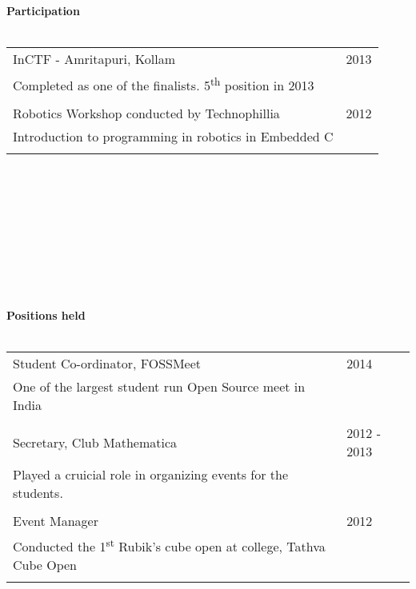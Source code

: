 \documentclass[a4paper,10pt]{article} %
\begin{document}
\textbf{Participation}\\ \\
\begin{tabular}{p{11cm}p{11cm}}
        \textsf{InCTF - Amritapuri, Kollam}                                                & \textsf{2013} \\
        \textsf{Completed as one of the finalists. 5\textsuperscript{th} position in 2013} & \\ \\
        \textsf{Robotics Workshop conducted by Technophillia}                              & \textsf{2012} \\
        \textsf{Introduction to programming in robotics in Embedded C}                     & \\ \\
\end{tabular} \\ \\ \\ \\ \\ \\ \\ \\ \\

\textbf{Positions held}\\ \\
\begin{tabular}{p{11cm}p{11cm}}
        \textsf{Student Co-ordinator, FOSSMeet}                                                                            & \textsf{2014} \\
        \textsf{One of the largest student run Open Source meet in India}                                                  & \\ \\
        \textsf{Secretary, Club Mathematica}                                                                               & \textsf{2012 - 2013} \\
        \textsf{Played a cruicial role in organizing events for the students.}                                              & \\ \\
        \textsf{Event Manager}                                                                                             & \textsf{2012} \\
        \textsf{Conducted the 1\textsuperscript{st} Rubik's cube open at college, Tathva Cube Open}                        & \\ \\
\end{tabular}
\end{document}
